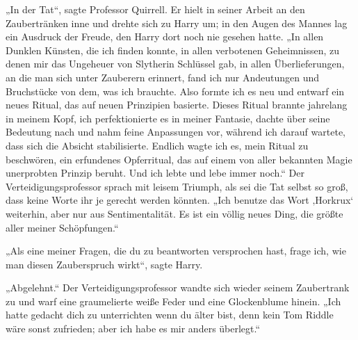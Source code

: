 „In der Tat“, sagte Professor Quirrell.
Er hielt in seiner Arbeit an den Zaubertränken inne und drehte sich zu Harry um; in den Augen des Mannes lag ein Ausdruck der Freude, den Harry dort noch nie gesehen hatte. „In allen Dunklen Künsten, die ich finden konnte, in allen verbotenen Geheimnissen, zu denen mir das Ungeheuer von Slytherin Schlüssel gab, in allen Überlieferungen, an die man sich unter Zauberern erinnert, fand ich nur Andeutungen und Bruchstücke von dem, was ich brauchte. Also formte ich es neu und entwarf ein neues Ritual, das auf neuen Prinzipien basierte. Dieses Ritual brannte jahrelang in meinem Kopf, ich perfektionierte es in meiner Fantasie, dachte über seine Bedeutung nach und nahm feine Anpassungen vor, während ich darauf wartete, dass sich die Absicht stabilisierte. Endlich wagte ich es, mein Ritual zu beschwören, ein erfundenes Opferritual, das auf einem von aller bekannten Magie unerprobten Prinzip beruht. Und ich lebte und lebe immer noch.“
Der Verteidigungsprofessor sprach mit leisem Triumph, als sei die Tat selbst so groß, dass keine Worte ihr je gerecht werden könnten.
„Ich benutze das Wort ‚Horkrux‘ weiterhin, aber nur aus Sentimentalität. Es ist ein völlig neues Ding, die größte aller meiner Schöpfungen.“

„Als eine meiner Fragen, die du zu beantworten versprochen hast, frage ich, wie man diesen Zauberspruch wirkt“, sagte Harry.

„Abgelehnt.“
Der Verteidigungsprofessor wandte sich wieder seinem Zaubertrank zu und warf eine graumelierte weiße Feder und eine Glockenblume hinein.
„Ich hatte gedacht dich zu unterrichten wenn du älter bist, denn kein Tom Riddle wäre sonst zufrieden; aber ich habe es mir anders überlegt.“

